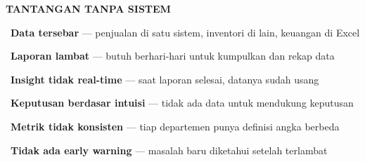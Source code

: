 \documentclass[a4paper]{article}
\begin{document}
\noindent
\begin{minipage}[t]{0.485\textwidth}
    \colorbox{RedLight}{%
        \begin{minipage}{\dimexpr\textwidth-14pt}
            \vspace{5pt}
            {\fontsize{10}{13}\selectfont\bfseries\color{RedText} TANTANGAN TANPA SISTEM}
            \vspace{5pt}
        \end{minipage}}
    \vspace{6pt}

    {\fontsize{9.5}{13}\selectfont\color{TextDark}%
    \textbullet\ \textbf{Data tersebar} --- penjualan di satu sistem, inventori di lain, keuangan di Excel\par\vspace{4pt}%
    \textbullet\ \textbf{Laporan lambat} --- butuh berhari-hari untuk kumpulkan dan rekap data\par\vspace{4pt}%
    \textbullet\ \textbf{Insight tidak real-time} --- saat laporan selesai, datanya sudah usang\par\vspace{4pt}%
    \textbullet\ \textbf{Keputusan berdasar intuisi} --- tidak ada data untuk mendukung keputusan\par\vspace{4pt}%
    \textbullet\ \textbf{Metrik tidak konsisten} --- tiap departemen punya definisi angka berbeda\par\vspace{4pt}%
    \textbullet\ \textbf{Tidak ada early warning} --- masalah baru diketahui setelah terlambat}%
\end{minipage}%
\hfill%
\end{document}

